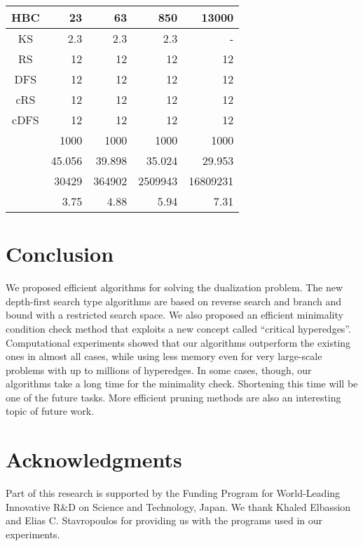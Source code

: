 \begin{table}
\begin{minipage}[t]{178pt}
\begin{center}
\begin{tabular}[c]{| r | r | r | r | r |}
\multicolumn{1}{|c||}{HBC} & 23 & 63 & 850 & 13000\\\hline
\multicolumn{1}{|c||}{KS} & 2.3 & 2.3 & 2.3 & -\\\hline
\multicolumn{1}{|c||}{RS} & 12 & 12 & 12 & 12\\\hline
\multicolumn{1}{|c||}{DFS} & 12 & 12 & 12 & 12\\\hline
\multicolumn{1}{|c||}{cRS} & 12 & 12 & 12 & 12\\\hline
\multicolumn{1}{|c||}{cDFS} & 12 & 12 & 12 & 12\\\hline
\hline
\multicolumn{1}{|c||}{} & 1000 & 1000 & 1000 & 1000\\\hline
\multicolumn{1}{|c||}{} & 45.056 & 39.898 & 35.024 & 29.953\\\hline
\multicolumn{1}{|c||}{} & 30429 & 364902 & 2509943 & 16809231\\\hline
\multicolumn{1}{|c||}{} & 3.75 & 4.88 & 5.94 & 7.31 \\\hline
\end{tabular}
\end{center}
\end{minipage}
\end{table} 



\section{Conclusion}

We proposed efficient algorithms for solving the dualization problem.
The new depth-first search type algorithms are based on reverse search
 and branch and bound with a restricted search space.
We also proposed an efficient minimality condition check method that
 exploits a new concept called ``critical hyperedges''.
Computational experiments showed that our algorithms outperform the existing
 ones in almost all cases, while using less memory even for very large-scale
 problems with up to millions of hyperedges.
In some cases, though, our algorithms take a long time for
 the minimality check.
Shortening this time will be one of the future tasks.
More efficient pruning methods are also an interesting topic of future work.

\section*{Acknowledgments}
Part of this research is supported by the Funding Program for World-Leading
 Innovative R\&D on Science and Technology, Japan.
We thank Khaled Elbassion and Elias C. Stavropoulos for providing us with
 the programs used in our experiments.


